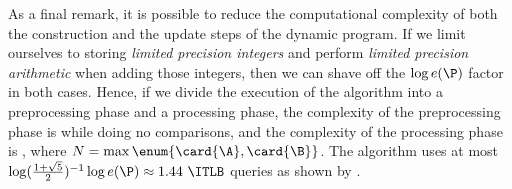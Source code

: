As a final remark, it is possible to reduce the computational
complexity of both the construction and the update steps of the dynamic program. If
we limit ourselves to storing \emph{limited precision integers} and perform
\emph{limited precision arithmetic} when adding those integers, then we can
shave off the \(\log e(\P)\) factor in both cases. Hence, if we divide the
execution of the algorithm into a preprocessing phase and a processing phase,
the complexity of the preprocessing phase is \BigO{\card{\A}\card{\B}} while doing no
comparisons, and the complexity of the processing phase is ,
where \(N = \max \enum{\card{\A},\card{\B}}\). The algorithm uses at most
\(\log(\frac{1+\sqrt{5}}{2})^{-1} \log e(\P) \approx 1.44~\ITLB\)
queries as shown by \citet*{linial:1984}.

